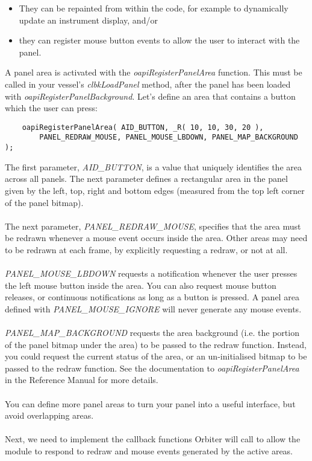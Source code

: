 \documentclass[Orbiter Developer Manual.tex]{subfiles}
\begin{document}
\begin{itemize}
\item They can be repainted from within the code, for example to dynamically update an instrument display, and/or
\item they can register mouse button events to allow the user to interact with the panel.
\end{itemize}

\noindent
A panel area is activated with the \textit{oapiRegisterPanelArea} function. This must be called in your vessel's \textit{clbkLoadPanel} method, after the panel has been loaded with \textit{oapiRegisterPanelBackground}. Let's define an area that contains a button which the user can press:

\begin{lstlisting}
	oapiRegisterPanelArea( AID_BUTTON, _R( 10, 10, 30, 20 ),
		PANEL_REDRAW_MOUSE, PANEL_MOUSE_LBDOWN, PANEL_MAP_BACKGROUND );
\end{lstlisting}

\noindent
The first parameter, \textit{AID\_BUTTON}, is a value that uniquely identifies the area across all panels. The next parameter defines a rectangular area in the panel given by the left, top, right and bottom edges (measured from the top left corner of the panel bitmap).\\
\\
The next parameter, \textit{PANEL\_REDRAW\_MOUSE}, specifies that the area must be redrawn whenever a mouse event occurs inside the area. Other areas may need to be redrawn at each frame, by explicitly requesting a redraw, or not at all.\\
\\
\textit{PANEL\_MOUSE\_LBDOWN} requests a notification whenever the user presses the left mouse button inside the area. You can also request mouse button releases, or continuous notifications as long as a button is pressed. A panel area defined with \textit{PANEL\_MOUSE\_IGNORE} will never generate any mouse events.\\
\\
\textit{PANEL\_MAP\_BACKGROUND} requests the area background (i.e. the portion of the panel bitmap under the area) to be passed to the redraw function. Instead, you could request the current status of the area, or an un-initialised bitmap to be passed to the redraw function. See the documentation to \textit{oapiRegisterPanelArea} in the Reference Manual for more details.\\
\\
You can define more panel areas to turn your panel into a useful interface, but avoid overlapping areas.\\
\\
Next, we need to implement the callback functions Orbiter will call to allow the module to respond to redraw and mouse events generated by the active areas.
\end{document}
